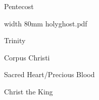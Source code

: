 \beginpart Pentecost


\bigskip

\pdfximage width 80mm {holyghost.pdf}

\centerline{\pdfrefximage \pdflastximage}



\bigskip

\eject


\paginaproxima

\beginpart Trinity



\paginaproxima

\beginpart Corpus Christi


\bigskip



\paginaproxima


\bigskip



\bigskip

\eject


\paginaproxima

\beginpart Sacred Heart/Precious Blood



\bigskip



\bigskip



\eject

\beginpart Christ the King


\bigskip




%

\bigskip


\eject

